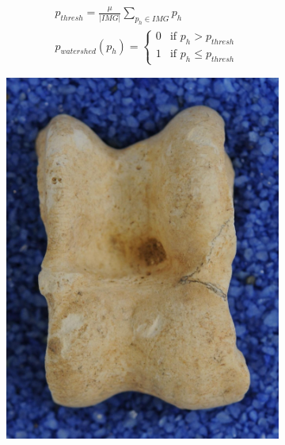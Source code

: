 \documentclass[pdftex,12pt,a4paper]{report}
\begin{document}
\begin{equation}
\begin{split}
& p_{thresh} = \frac{\mu}{|IMG|} \sum_{p_h \in IMG} p_h \\
& p_{watershed}(p_h) = \begin{cases} 0 & \text{if } p_h > p_{thresh} \\ 1 & \text{if } p_h \leq p_{thresh} \end{cases}
\end{split}
\end{equation}

\begin{figure}[h]
	\centering
	\begin{subfigure}[b]{0.24\textwidth}
		\centering
		\includegraphics[width=.9\linewidth]{img/segmentation/good/watershed/cut.jpg}
		\subcaption{}
	\end{subfigure}
	\begin{subfigure}[b]{0.24\textwidth}
		\centering

\end{subfigure}
\end{figure}
\end{document}
